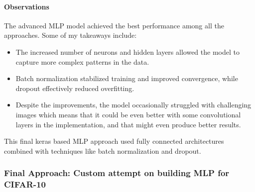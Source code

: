 \documentclass[lettersize,journal]{IEEEtran}
\begin{document}
\paragraph{\textbf{Observations}}

The advanced MLP model achieved the best performance among all the approaches. Some of my takeaways include:
\begin{itemize}
    \item The increased number of neurons and hidden layers allowed the model to capture more complex patterns in the data.
    \item Batch normalization stabilized training and improved convergence, while dropout effectively reduced overfitting.
    \item Despite the improvements, the model occasionally struggled with challenging images which means that it could be even better with some convolutional layers in the implementation, and that might even produce better results.
\end{itemize}

This final keras based MLP approach used fully connected architectures combined with techniques like batch normalization and dropout.

\subsubsection{\textbf{Final Approach: Custom attempt on building MLP for CIFAR-10}}
\end{document}
